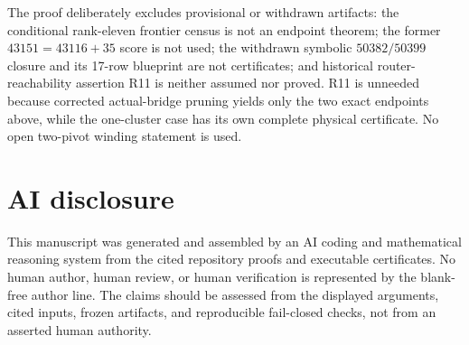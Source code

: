 \documentclass[11pt]{article}
\theoremstyle{remark}
\begin{document}
The proof deliberately excludes provisional or withdrawn artifacts: the
conditional rank-eleven frontier census is not an endpoint theorem; the former
$43151=43116+35$ score is not used; the withdrawn symbolic $50382/50399$
closure and its 17-row blueprint are not certificates; and historical
router-reachability assertion R11 is neither assumed nor proved.  R11 is
unneeded because corrected actual-bridge pruning yields only the two exact
endpoints above, while the one-cluster case has its own complete physical
certificate.  No open two-pivot winding statement is used.

\section*{AI disclosure}

This manuscript was generated and assembled by an AI coding and mathematical
reasoning system from the cited repository proofs and executable certificates.
No human author, human review, or human verification is represented by the
blank-free author line.  The claims should be assessed from the displayed
arguments, cited inputs, frozen artifacts, and reproducible fail-closed checks,
not from an asserted human authority.
\end{document}
